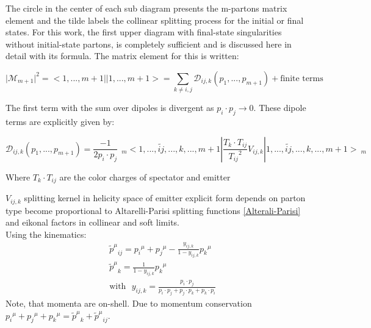 The circle in the center of each sub diagram presents the m-partons matrix element and the tilde labels the collinear splitting process for the initial or final states.
For this work, the first upper diagram with final-state singularities without initial-state partons, is completely sufficient and is discussed here in detail with its formula.
The matrix element for this is written:

\begin{equation}
\vert {{\mathcal{M}}}_{m+1}  \vert^2 = < 1,...,m+1 || 1,...,m+1 > = \sum_{k \neq i,j} {{\mathcal{D}}}_{ij,k}(p_1,...,p_{m+1}) +\text{finite terms}
\end{equation}

The first term with the sum over dipoles is divergent as $ p_i \cdot p_j \rightarrow 0 $. These dipole terms are explicitly given by:

\begin{equation}
 {{\mathcal{D}}}_{ij,k}(p_1,...,p_{m+1}) = \frac{-1}{2p_i \cdot p_j} \:\:_m<1,...,\tilde{ij},...,k,...,m+1 |\frac{T_k \cdot T_{ij}}{{T_{ij}}^2} V_{ij,k}| 1,...,\tilde{ij},...,k,...,m+1 >\:_m
\end{equation}

Where $ T_k \cdot T_{ij} $ are the color charges of spectator and emitter

$ V_{ij,k} $ splitting kernel in helicity space of emitter
explicit form depends on parton type become proportional to Altarelli-Parisi splitting functions \ref{Alterali-Parisi} and eikonal factors
in collinear and soft limits.\\
Using the kinematics:
\begin{equation}
\begin{split}
&{\tilde{p}^{\mu}}_{ij} = {p_i}^{\mu}+{p_j}^{\mu}-\frac{y_{ij,k}}{1-y_{ij,k}}{p_k}^{\mu}\\
&{\tilde{p}^{\mu}}_{k} = \frac{1}{1-y_{ij,k}}{p_k}^{\mu}\\
&\text{with}\:\:\:y_{ij,k}=\frac{p_i \cdot p_j}{p_i \cdot p_j+p_j \cdot p_k+p_k \cdot p_i}
\end{split}
\end{equation}
Note, that momenta are on-shell. Due to momentum conservation ${p_i}^{\mu}+{p_j}^{\mu}+{p_k}^{\mu}= {\tilde{p}^{\mu}}_{k} +{\tilde{p}^{\mu}}_{ij} $. 





\newpage
